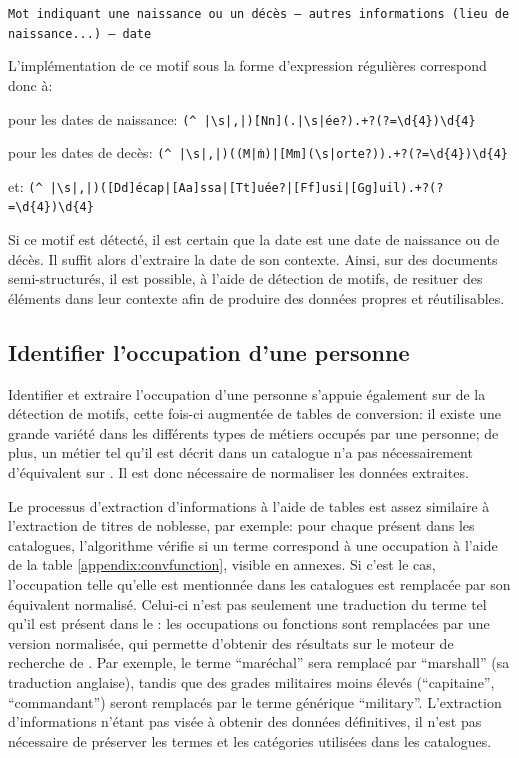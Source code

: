 \begin{center}
	\texttt{Mot indiquant une naissance ou un décès -- autres informations (lieu de naissance...) -- date}
\end{center}

L'implémentation de ce motif sous la forme d'\glspl{expression régulière} correspond donc à:

\begin{center}
	pour les dates de naissance: \texttt{(\^~|\textbackslash{}s|,|\.)[Nn](.|\textbackslash{}s|ée?).+?(?=\textbackslash{}d\{4\})\textbackslash{}d\{4\}}
	
	pour les dates de decès: \texttt{(\^~|\textbackslash{}s|,|\.)((M\.|m\.)|[Mm](\textbackslash{}s|orte?)).+?(?=\textbackslash{}d\{4\})\textbackslash{}d\{4\}}
	
	et: \texttt{(\^~|\textbackslash{}s|,|\.)([Dd]écap|[Aa]ssa|[Tt]uée?|[Ff]usi|[Gg]uil).+?(?=\textbackslash{}d\{4\})\textbackslash{}d\{4\}}
\end{center}

Si ce motif est détecté, il est certain que la date est une date de naissance ou de décès. Il suffit alors d'extraire la date de son contexte. Ainsi, sur des documents semi-structurés, il est possible, à l'aide de détection de motifs, de resituer des éléments dans leur contexte afin de produire des données propres et réutilisables.

\subsection{Identifier l'occupation d'une personne}
Identifier et extraire l'occupation d'une personne s'appuie également sur de la détection de motifs, cette fois-ci augmentée de tables de conversion: il existe une grande variété dans les différents types de métiers occupés par une personne; de plus, un métier tel qu'il est décrit dans un catalogue n'a pas nécessairement d'équivalent sur \wkd{}. Il est donc nécessaire de normaliser les données extraites. 

Le processus d'extraction d'informations à l'aide de tables est assez similaire à l'extraction de titres de noblesse, par exemple: pour chaque \ttrait{} présent dans les catalogues, l'algorithme vérifie si un terme correspond à une occupation à l'aide de la table \ref{appendix:convfunction}, visible en annexes. Si c'est le cas, l'occupation telle qu'elle est mentionnée dans les catalogues est remplacée par son équivalent normalisé. Celui-ci n'est pas seulement une traduction du terme tel qu'il est présent dans le \ttrait{}: les occupations ou fonctions sont remplacées par une version normalisée, qui permette d'obtenir des résultats sur le moteur de recherche de \wkd{}. Par exemple, le terme \enquote{maréchal} sera remplacé par \enquote{marshall} (sa traduction anglaise), tandis que des grades militaires moins élevés (\enquote{capitaine}, \enquote{commandant}) seront remplacés par le terme générique \enquote{military}. L'extraction d'informations n'étant pas visée à obtenir des données définitives, il n'est pas nécessaire de préserver les termes et les catégories utilisées dans les catalogues.

